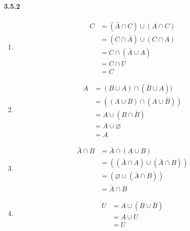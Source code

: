 \documentclass[11pt, letterpaper, twocolumn, fleqn]{article}
\let\emptyset\varnothing
\begin{document}
    \paragraph{3.5.2}
    \renewcommand{\labelenumi}{\alph{enumi}.}
    \begin{enumerate}
        \item 
            \begin{align*}
                C   & = (\bar{A} \cap C) \cup (A \cap C)    \\
                    & = (C \cap \bar{A}) \cup (C \cap A)    \tag{Commutative} \\
                    & = C \cap (\bar{A} \cup A)             \tag{Distributive} \\
                    & = C \cap U                            \tag{Complement} \\
                    & = C                                   \tag{Identity}
            \end{align*}
        \item
            \begin{align*}
                A   &= (B \cup A) \cap (\bar{B} \cup A ))   \\
                    &= ((A \cup B) \cap (A \cup \bar{B}))   \tag{Commutative}\\
                    &= A \cup (B \cap \bar{B})              \tag{Distributive}\\
                    &= A \cup \emptyset                     \tag{Complement}\\
                    &= A                                    \tag{Identity}
            \end{align*}
        \addtocounter{enumi}{1}
        \item
            \begin{align*}
                \bar{A} \cap B &= \bar{A} \cap (A \cup B) \\
                               &=((\bar{A} \cap A)\cup(\bar{A} \cap B)) \tag{Distributive}\\
                               &=(\emptyset \cup (\bar{A} \cap B))      \tag{Complement}\\
                               &=\bar{A} \cap B                         \tag{Identity}
            \end{align*}
        \addtocounter{enumi}{2}
        \item
            \begin{align*}
                U &= A \cup (B \cup \bar{B})    \\
                  &= A \cup U   \tag{Complement}\\
                  &= U          \tag{Domination}
            \end{align*}
    \end{enumerate}
    
\end{document}
